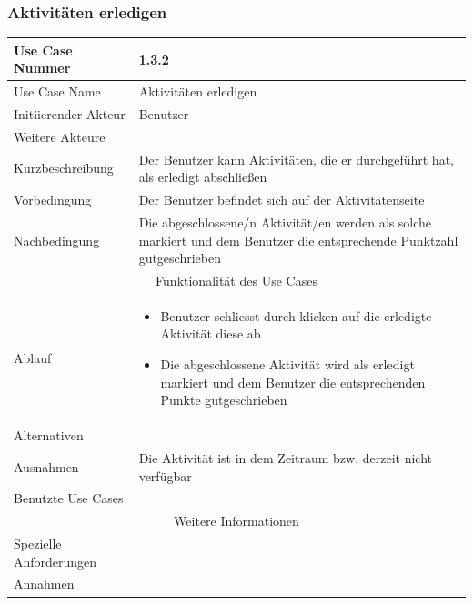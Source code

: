 \documentclass[10pt,a4paper]{article}
\begin{document}
	\subsubsection{Aktivit\"aten erledigen}
	\begin{tabularx}{\textwidth}{|l|X|}
	\hline Use Case Nummer & 1.3.2\\ 
	\hline Use Case Name & Aktivit\"aten erledigen \\ 
	\hline Initiierender Akteur & Benutzer \\
	\hline Weitere Akteure & \\
	\hline Kurzbeschreibung & Der Benutzer kann Aktivit\"aten, die er durchgef\"uhrt hat, als erledigt abschließen \\
	\hline Vorbedingung & Der Benutzer befindet sich auf der Aktivit\"atenseite \\
	\hline Nachbedingung & Die abgeschlossene/n Aktivit\"at/en werden als solche markiert und dem Benutzer die entsprechende Punktzahl gutgeschrieben \\
	\hline \multicolumn{2}{|c|}{Funktionalität des Use Cases}\\
	\hline Ablauf & \begin{itemize}
			\item Benutzer schliesst durch klicken auf die erledigte Aktivit\"at diese ab
			\item Die abgeschlossene Aktivit\"at wird als erledigt markiert und dem Benutzer die entsprechenden Punkte gutgeschrieben
		\end{itemize} \\
	\hline Alternativen & \\
	\hline Ausnahmen & Die Aktivit\"at ist in dem Zeitraum bzw. derzeit nicht verf\"ugbar \\
	\hline Benutzte Use Cases &  \\
	\hline \multicolumn{2}{|c|}{Weitere Informationen} \\
	\hline Spezielle Anforderungen & \\
	\hline Annahmen & \\
	\hline
	\end{tabularx} 
\end{document}
